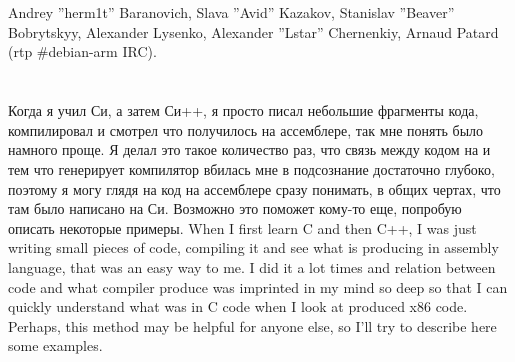 \documentclass[11pt,a4paper,oneside]{book}
\begin{document}
\chapter{}

{Andrey ''herm1t'' Baranovich, Slava ''Avid'' Kazakov, Stanislav ''Beaver'' Bobrytskyy, Alexander Lysenko, 
Alexander ''Lstar'' Chernenkiy}, Arnaud Patard (rtp  \#debian-arm IRC).

\mainmatter

\chapter{}

\IFRU
{Когда я учил Си, а затем Си++, я просто писал небольшие фрагменты кода, компилировал и смотрел что 
получилось на ассемблере, так мне понять было намного проще. Я делал это такое количество раз, 
что связь между кодом на \CCpp и тем что генерирует компилятор вбилась мне в подсознание достаточно 
глубоко, поэтому я могу глядя на код на ассемблере сразу понимать, в общих чертах, что там было написано 
на Си. Возможно это поможет кому-то еще, попробую описать некоторые примеры.}
{When I first learn C and then C++, I was just writing small pieces of code, compiling it and see what 
is producing in assembly language, that was an easy way to me. I did it a lot times and relation 
between \CCpp code and what compiler produce was imprinted in my mind so deep so that 
I can quickly understand what was in C code when I look at produced x86 code. 
Perhaps, this method may be helpful for anyone else, so I'll try to describe here some examples.}




















\end{document}
